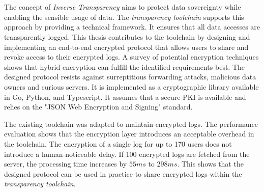 \documentclass[../main.tex]{subfiles}
\begin{document}
\chapter*{\myAbstractTitle}

The concept of \emph{Inverse Transparency} aims to protect data sovereignty while enabling the sensible usage of data.
The \emph{transparency toolchain} supports this approach by providing a technical framework.
It ensures that all data accesses are transparently logged.
This thesis contributes to the toolchain by designing and implementing an end-to-end encrypted protocol that allows users to share and revoke access to their encrypted logs.
A survey of potential encryption techniques shows that hybrid encryption can fulfill the identified requirements best.
The designed protocol resists against surreptitious forwarding attacks, malicious data owners and curious servers.
It is implemented as a cryptographic library available in Go, Python, and Typescript.
It assumes that a secure PKI is available and relies on the "JSON Web Encryption and Signing" standard.

The existing toolchain was adapted to maintain encrypted logs.
The performance evaluation shows that the encryption layer introduces an acceptable overhead in the toolchain.
The encryption of a single log for up to 170 users does not introduce a human-noticeable delay.
If 100 encrypted logs are fetched from the server, the processing time increases by $55ms$ to $298ms$.
This shows that the designed protocol can be used in practice to share encrypted logs within the \emph{transparency toolchain}.
\end{document}
